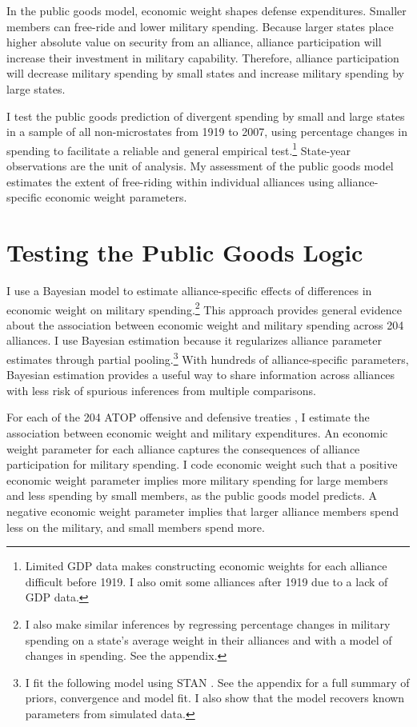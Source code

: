 \documentclass[12pt]{article}
\begin{document}
In the public goods model, economic weight shapes defense expenditures. 
Smaller members can free-ride and lower military spending. 
Because larger states place higher absolute value on security from an alliance, alliance participation will increase their investment in military capability. 
Therefore, alliance participation will decrease military spending by small states and increase military spending by large states. 


I test the public goods prediction of divergent spending by small and large states in a sample of all non-microstates from 1919 to 2007, using percentage changes in spending to facilitate a reliable and general empirical test.\footnote{Limited GDP data makes constructing economic weights for each alliance difficult before 1919. I also omit some alliances after 1919 due to a lack of GDP data.}
State-year observations are the unit of analysis.
My assessment of the public goods model estimates the extent of free-riding within individual alliances using alliance-specific economic weight parameters.  
 

\section{Testing the Public Goods Logic}


I use a Bayesian model to estimate alliance-specific effects of differences in economic weight on military spending.\footnote{I also make similar inferences by regressing percentage changes in military spending on a state's average weight in their alliances and with a model of changes in spending. See the appendix.}
This approach provides general evidence about the association between economic weight and military spending across 204 alliances.
I use Bayesian estimation because it regularizes alliance parameter estimates through partial pooling.\footnote{I fit the following model using STAN \citep{Carpenteretal2016}. See the appendix for a full summary of priors, convergence and model fit. I also show that the model recovers known parameters from simulated data.}
With hundreds of alliance-specific parameters, Bayesian estimation provides a useful way to share information across alliances with less risk of spurious inferences from multiple comparisons. 


For each of the 204 ATOP offensive and defensive treaties \citep{Leedsetal2002}, I estimate the association between economic weight and military expenditures. 
An economic weight parameter for each alliance captures the consequences of alliance participation for military spending. 
I code economic weight such that a positive economic weight parameter implies more military spending for large members and less spending by small members, as the public goods model predicts. 
A negative economic weight parameter implies that larger alliance members spend less on the military, and small members spend more. 
\end{document}
